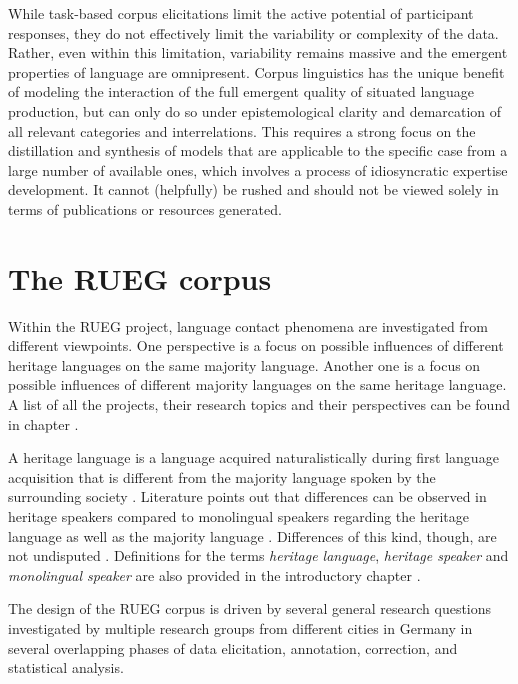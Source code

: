 \documentclass[output=paper,colorlinks,citecolor=brown]{langscibook}
\begin{document}
While task-based corpus elicitations limit the active potential of participant responses, they do not effectively limit the variability or complexity of the data. Rather, even within this limitation, variability remains massive and the emergent properties of language are omnipresent. Corpus linguistics has the unique benefit of modeling the interaction of the full emergent quality of situated language production, but can only do so under epistemological clarity and demarcation of all relevant categories and interrelations. This requires a strong focus on the distillation and synthesis of models that are applicable to the specific case from a large number of available ones, which involves a process of idiosyncratic expertise development. It cannot (helpfully) be rushed and should not be viewed solely in terms of publications or resources generated.

\section{The RUEG corpus} \label{sec:shadrovaetal:rueg_corpus}

Within the RUEG project, language contact phenomena are investigated from different viewpoints. One perspective is a focus on possible influences of different heritage languages on the same majority language. Another one is a focus on possible influences of different majority languages on the same heritage language. A list of all the projects, their research topics and their perspectives can be found in chapter .

A heritage language is a language acquired naturalistically during first language acquisition that is different from the majority language spoken by the surrounding society \parencite{cabo_rothman2012,montrul_2015}. Literature points out that differences can be observed in heritage speakers compared to monolingual speakers regarding the heritage language as well as the majority language \parencite{rothman2009,polinsky_2018}. Differences of this kind, though, are not undisputed \parencite{10.3389/fpsyg.2021.717973,oezsoy_blum_2023}. Definitions for the terms \textit{heritage language}, \textit{heritage speaker} and \textit{monolingual speaker} are also provided in the introductory chapter .

The design of the RUEG corpus is driven by several general research questions investigated by multiple research groups from different cities in Germany in several overlapping phases of data elicitation, annotation, correction, and statistical analysis.
\end{document}
